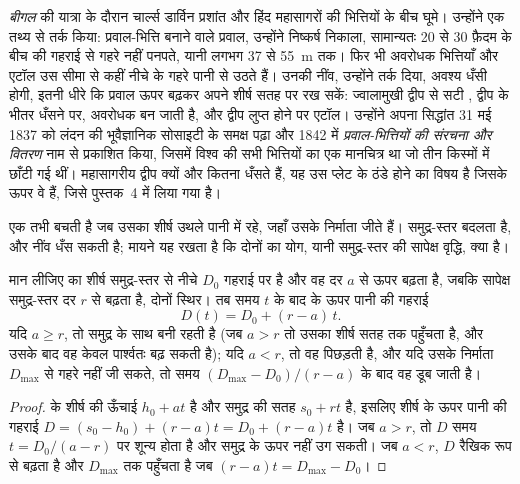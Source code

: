 \begin{history}[धँसती नींव पर भित्तियाँ, 1837--1842]
\emph{बीगल} की यात्रा के दौरान चार्ल्स डार्विन प्रशांत और हिंद महासागरों की भित्तियों के बीच घूमे। उन्होंने एक तथ्य से तर्क किया: प्रवाल-भित्ति बनाने वाले प्रवाल, उन्होंने निष्कर्ष निकाला, सामान्यतः 20 से 30 फ़ैदम के बीच की गहराई से गहरे नहीं पनपते, यानी लगभग 37 से \qty{55}{m} तक। फिर भी अवरोधक भित्तियाँ और एटॉल उस सीमा से कहीं नीचे के गहरे पानी से उठते हैं। उनकी नींव, उन्होंने तर्क दिया, अवश्य धँसी होगी, इतनी धीरे कि प्रवाल ऊपर बढ़कर अपने शीर्ष सतह पर रख सकें: ज्वालामुखी द्वीप से सटी , द्वीप के भीतर धँसने पर, अवरोधक बन जाती है, और द्वीप लुप्त होने पर एटॉल। उन्होंने अपना सिद्धांत 31 मई 1837 को लंदन की भूवैज्ञानिक सोसाइटी के समक्ष पढ़ा और 1842 में \emph{प्रवाल-भित्तियों की संरचना और वितरण} नाम से प्रकाशित किया, जिसमें विश्व की सभी भित्तियों का एक मानचित्र था जो तीन किस्मों में छाँटी गई थीं। महासागरीय द्वीप क्यों और कितना धँसते हैं, यह उस प्लेट के ठंडे होने का विषय है जिसके ऊपर वे हैं, जिसे पुस्तक~4 में लिया गया है।
\end{history}

एक  तभी बचती है जब उसका शीर्ष उथले पानी में रहे, जहाँ उसके निर्माता जीते हैं। समुद्र-स्तर बदलता है, और नींव धँस सकती है; मायने यह रखता है कि दोनों का योग, यानी समुद्र-स्तर की सापेक्ष वृद्धि, क्या है।

\begin{proposition}[ऊपर उठो या डूबो]\label{prop:b1:chemical-biogenic-sediments:keep-up}
मान लीजिए  का शीर्ष समुद्र-स्तर से नीचे $D_0$ गहराई पर है और वह दर $a$ से ऊपर बढ़ता है, जबकि सापेक्ष समुद्र-स्तर दर $r$ से बढ़ता है, दोनों स्थिर। तब समय $t$ के बाद  के ऊपर पानी की गहराई
\[
D(t) = D_0 + (r - a)\,t .
\]
यदि $a \ge r$, तो  समुद्र के साथ बनी रहती है (जब $a > r$ तो उसका शीर्ष सतह तक पहुँचता है, और उसके बाद वह केवल पार्श्वतः बढ़ सकती है); यदि $a < r$, तो वह पिछड़ती है, और यदि उसके निर्माता $D_{\max}$ से गहरे नहीं जी सकते, तो समय $(D_{\max} - D_0)/(r - a)$ के बाद वह डूब जाती है।
\end{proposition}

\begin{proof}
 के शीर्ष की ऊँचाई $h_0 + a t$ है और समुद्र की सतह $s_0 + r t$ है, इसलिए शीर्ष के ऊपर पानी की गहराई $D = (s_0 - h_0) + (r - a)t = D_0 + (r-a)t$ है। जब $a > r$, तो $D$ समय $t = D_0/(a-r)$ पर शून्य होता है और  समुद्र के ऊपर नहीं उग सकती। जब
$a < r$, $D$ रैखिक रूप से बढ़ता है और $D_{\max}$ तक पहुँचता है जब $(r-a)t = D_{\max} -
D_0$।
\end{proof}

